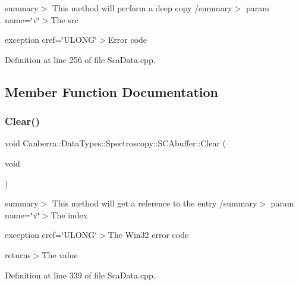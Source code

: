 summary$>$ This method will perform a deep copy /summary$>$ param name=\char`\"{}v\char`\"{}$>$The src

exception cref=\char`\"{}\+U\+L\+O\+N\+G\char`\"{}$>$Error code

Definition at line 256 of file Sca\+Data.\+cpp.



\subsection{Member Function Documentation}
\mbox{\label{class_canberra_1_1_data_types_1_1_spectroscopy_1_1_s_c_abuffer_a8d600a8c0884b568ba524a79e4773b0d_a8d600a8c0884b568ba524a79e4773b0d}} 
\subsubsection{\texorpdfstring{Clear()}{Clear()}}
{\footnotesize\ttfamily void Canberra\+::\+Data\+Types\+::\+Spectroscopy\+::\+S\+C\+Abuffer\+::\+Clear (\begin{DoxyParamCaption}\item[{void}]{ }\end{DoxyParamCaption})}

summary$>$ This method will get a reference to the entry /summary$>$ param name=\char`\"{}v\char`\"{}$>$The index

exception cref=\char`\"{}\+U\+L\+O\+N\+G\char`\"{}$>$The Win32 error code

returns$>$The value

Definition at line 339 of file Sca\+Data.\+cpp.

\mbox{\label{class_canberra_1_1_data_types_1_1_spectroscopy_1_1_s_c_abuffer_a597f4d35ac60febc4fa6b67677c99b41_a597f4d35ac60febc4fa6b67677c99b41}} 
